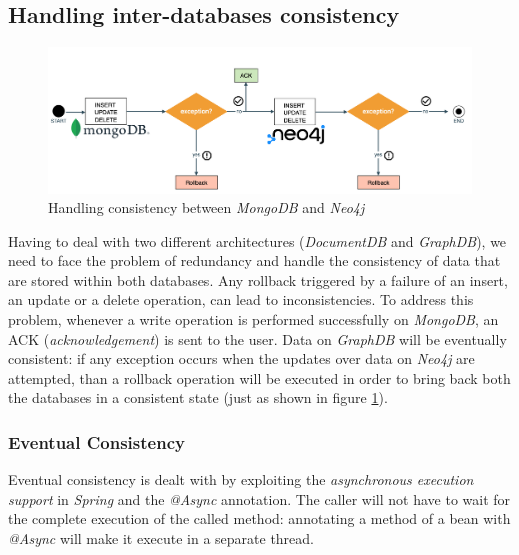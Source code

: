 \subsection{Handling inter-databases consistency}
\begin{figure}[t]
	\centering
	\includegraphics[width=1\textwidth]{chapter3/img/rollback.png}
	\caption{Handling consistency between \emph{MongoDB} and \emph{Neo4j}}
	\label{fig:rb}
\end{figure}
Having to deal with two different architectures (\emph{DocumentDB} and \emph{GraphDB}), we need to face the problem of redundancy and handle the consistency of data that are stored within both databases. 
Any rollback triggered by a failure of an insert, an update or a delete operation, can lead to inconsistencies. 
To address this problem, whenever a write operation  is performed successfully on \emph{MongoDB}, an ACK (\emph{acknowledgement}) is sent to the user. Data on \emph{GraphDB} will be eventually consistent: if any exception occurs when the updates over data on \emph{Neo4j} are attempted, than a rollback operation will be executed in order to bring back both the databases in a consistent state (just as shown in figure \ref{fig:rb}).
\subsubsection{Eventual Consistency}
Eventual consistency is dealt with by exploiting the \emph{asynchronous execution support} in \emph{Spring} and the \emph{@Async} annotation.
The caller will not have to wait for the complete execution of the called method: annotating a method of a bean with \emph{@Async} will make it execute in a separate thread. 